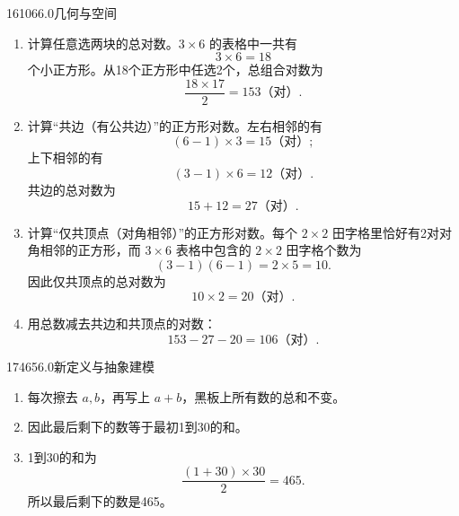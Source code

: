 \begin{solution}{16}{106}{6.0}{几何与空间}
\begin{enumerate}[label=\textbf{Step \arabic*:},leftmargin=*]
  \item 计算任意选两块的总对数。\(3\times6\) 的表格中一共有
  \[
    3\times6=18
  \]
  个小正方形。从18个正方形中任选2个，总组合对数为
  \[
    \frac{18\times17}{2}=153\text{（对）}.
  \]
  \item 计算“共边（有公共边）”的正方形对数。左右相邻的有
  \[
    (6-1)\times3=15\text{（对）};
  \]
  上下相邻的有
  \[
    (3-1)\times6=12\text{（对）}.
  \]
  共边的总对数为
  \[
    15+12=27\text{（对）}.
  \]
  \item 计算“仅共顶点（对角相邻）”的正方形对数。每个 \(2\times2\) 田字格里恰好有2对对角相邻的正方形，而 \(3\times6\) 表格中包含的 \(2\times2\) 田字格个数为
  \[
    (3-1)(6-1)=2\times5=10.
  \]
  因此仅共顶点的总对数为
  \[
    10\times2=20\text{（对）}.
  \]
  \item 用总数减去共边和共顶点的对数：
  \[
    153-27-20=106\text{（对）}.
  \]
\end{enumerate}
\end{solution}

\begin{solution}{17}{465}{6.0}{新定义与抽象建模}
\begin{enumerate}[label=\textbf{Step \arabic*:},leftmargin=*]
  \item 每次擦去 \(a,b\)，再写上 \(a+b\)，黑板上所有数的总和不变。
  \item 因此最后剩下的数等于最初1到30的和。
  \item 1到30的和为
  \[
    \frac{(1+30)\times30}{2}=465.
  \]
  所以最后剩下的数是465。
\end{enumerate}
\end{solution}

